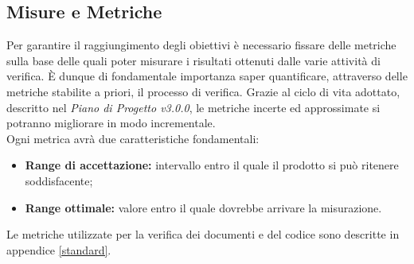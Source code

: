 \subsection{Misure e Metriche}
Per garantire il raggiungimento degli obiettivi è necessario fissare delle metriche sulla base delle quali poter misurare i risultati ottenuti dalle varie attività di verifica. È dunque di fondamentale importanza saper quantificare, attraverso delle metriche stabilite a priori, il processo di verifica. Grazie al ciclo di vita adottato, descritto nel \textit{Piano di Progetto v3.0.0}, le metriche incerte ed approssimate si potranno migliorare in modo incrementale.\\
Ogni metrica avrà due caratteristiche fondamentali:
\begin{itemize}
	\item \textbf{Range di accettazione:} intervallo entro il quale il prodotto si può ritenere soddisfacente;
	\item \textbf{Range ottimale:} valore entro il quale dovrebbe arrivare la misurazione.
\end{itemize}
Le metriche utilizzate per la verifica dei documenti e del codice sono descritte in appendice \ref{standard}.

